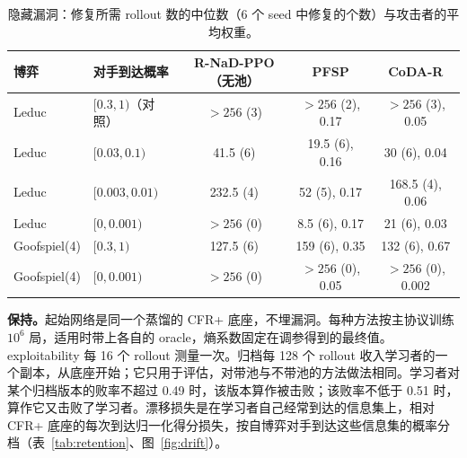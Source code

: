 \documentclass{article}
\theoremstyle{plain}
\theoremstyle{remark}
\newcommand{\codar}{CoDA-R}
\newcommand{\rnad}{R-NaD-PPO}
\begin{document}
\begin{table}[!htbp]
\caption{隐藏漏洞：修复所需 rollout 数的中位数（6 个 seed 中修复的个数）与攻击者的平均权重。}
\label{tab:hidden}
\begin{center}
\footnotesize
\begin{tabular}{llccc}
\toprule
博弈 & 对手到达概率 & \rnad{}（无池） & PFSP & \codar{} \\
\midrule
Leduc & $[0.3,1)$（对照） & $>256$ (3) & $>256$ (2), 0.17 & $>256$ (3), 0.05 \\
Leduc & $[0.03,0.1)$ & 41.5 (6) & 19.5 (6), 0.16 & 30 (6), 0.04 \\
Leduc & $[0.003,0.01)$ & 232.5 (4) & 52 (5), 0.17 & 168.5 (4), 0.06 \\
Leduc & $[0,0.001)$ & $>256$ (0) & 8.5 (6), 0.17 & 21 (6), 0.03 \\
Goofspiel(4) & $[0.3,1)$ & 127.5 (6) & 159 (6), 0.35 & 132 (6), 0.67 \\
Goofspiel(4) & $[0,0.001)$ & $>256$ (0) & $>256$ (0), 0.05 & $>256$ (0), 0.002 \\
\bottomrule
\end{tabular}
\end{center}
\end{table}

\textbf{保持。}起始网络是同一个蒸馏的 CFR+ 底座，不埋漏洞。每种方法按主协议训练 $10^6$ 局，适用时带上各自的 oracle，熵系数固定在调参得到的最终值。exploitability 每 16 个 rollout 测量一次。归档每 128 个 rollout 收入学习者的一个副本，从底座开始；它只用于评估，对带池与不带池的方法做法相同。学习者对某个归档版本的败率不超过 0.49 时，该版本算作被击败；该败率不低于 0.51 时，算作它又击败了学习者。漂移损失是在学习者自己经常到达的信息集上，相对 CFR+ 底座的每次到达归一化得分损失，按自博弈对手到达这些信息集的概率分档（表~\ref{tab:retention}、图~\ref{fig:drift}）。
\end{document}
